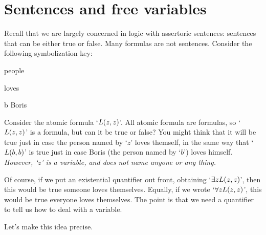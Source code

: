 

\section{Sentences and free variables}\label{s:FreeVars}

Recall that we are largely concerned in logic with assertoric sentences: sentences that can be either true or false. Many formulas are not sentences. Consider the following symbolization key:
	\begin{ekey}
		\item[\text{domain}] people
		\item[\atom{L}{x,y}]  loves 
		\item[b] Boris
	\end{ekey}
Consider the atomic formula `$L(z,z)$'. All atomic formula are formulas, so `$L(z,z)$' is a formula, but can it be true or false? You might think that it will be true just in case the person named by `$z$' loves themself, in the same way that `$L(b,b)$' is true just in case Boris (the person named by `$b$') loves himself. \emph{However, `$z$' is a variable, and does not name anyone or any thing.}

Of course, if we put an existential quantifier out front, obtaining `$\exists zL(z,z)$', then this would be true \ifeff{} someone loves themselves. Equally, if we wrote `$\forall z L(z,z)$', this would be true \ifeff{} everyone loves themselves. The point is that we need a quantifier to tell us how to deal with a variable.

Let's make this idea precise.


